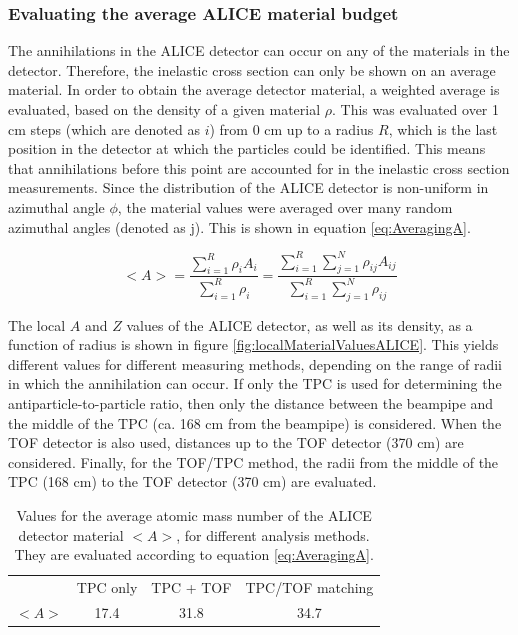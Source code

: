 \subsubsection{Evaluating the average ALICE material budget}\label{sec:Meth:AveragingMaterial}
The annihilations in the ALICE detector can occur on any of the materials in the detector. Therefore, the inelastic cross section can only be shown on an average material. In order to obtain the average detector material, a weighted average is evaluated, based on the density of a given material $\rho$. This was evaluated over 1 cm steps (which are denoted as $i$) from 0 cm up to a radius $R$, which is the last position in the detector at which the particles could be identified. This means that annihilations before this point are accounted for in the inelastic cross section measurements. Since the distribution of the ALICE detector is non-uniform in azimuthal angle $\phi$, the material values were averaged over many random azimuthal angles (denoted as j). This is shown in equation \ref{eq:AveragingA}. 


\begin{equation}\label{eq:AveragingA}
<A> = 
\frac{\sum_{i=1}^R \rho_iA_i}{\sum_{i=1}^R \rho_i} = 
\frac{\sum_{i=1}^R \sum_{j=1}^N \rho_{ij}A_{ij}}{\sum_{i=1}^R \sum_{j=1}^N \rho_{ij}}
\end{equation}


The local $A$ and $Z$ values of the ALICE detector, as well as its density, as a function of radius is shown in figure \ref{fig:localMaterialValuesALICE}. This yields different values for different measuring methods, depending on the range of radii in which the annihilation can occur. If only the TPC is used for determining the antiparticle-to-particle ratio, then only the distance between the beampipe and the middle of the TPC (ca. 168 cm from the beampipe) is considered. When the TOF detector is also used, distances up to the TOF detector (370 cm) are considered. Finally, for the TOF/TPC method, the radii from the middle of the TPC (168 cm) to the TOF detector (370 cm) are evaluated. \\

\begin{table}[]
    \centering
    \begin{tabular}{|c|c|c|c|}
              & TPC only & TPC + TOF & TPC/TOF matching \hline\\
        $<A>$ & 17.4 & 31.8 & 34.7 \hline\\
    \end{tabular}
    \caption{Values for the average atomic mass number of the ALICE detector material $<A>$, for different analysis methods. They are evaluated according to equation \ref{eq:AveragingA}.}
    \label{tab:MeanALabels}
\end{table}


